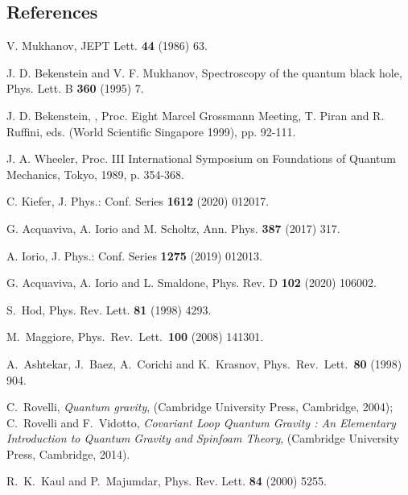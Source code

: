 \documentclass[aps,prd,showkeys,nofootinbib,superscriptaddress]{revtex4-2}
\begin{document}
\begin{thebibliography}{99}

 \section*{References}

V. Mukhanov,
JEPT Lett. {\bf44} (1986) 63.

J. D. Bekenstein and V. F. Mukhanov, Spectroscopy of the quantum black hole,
Phys. Lett. B {\bf 360} (1995) 7.

J. D. Bekenstein, ,
Proc. Eight Marcel Grossmann Meeting, T. Piran and R. Ruffini, eds. (World Scientific Singapore 1999), pp. 92-111.


 J. A. Wheeler,
 Proc. III International Symposium on Foundations of Quantum Mechanics, Tokyo, 1989, p. 354-368.

 C. Kiefer,
J. Phys.: Conf. Series {\bf 1612} (2020) 012017.


 G. Acquaviva, A. Iorio and M. Scholtz,
Ann. Phys. {\bf 387} (2017) 317.

 A. Iorio,
J. Phys.: Conf. Series {\bf 1275} (2019) 012013.

G. Acquaviva, A. Iorio and L. Smaldone,
Phys. Rev. D {\bf 102} (2020) 106002.

S.~Hod,
Phys. Rev. Lett. \textbf{81} (1998) 4293.

M.~Maggiore,
Phys.\ Rev.\ Lett.\ {\bf 100} (2008) 141301.

  A.~Ashtekar, J.~Baez, A.~Corichi and K.~Krasnov,
  Phys.\ Rev.\ Lett.\  {\bf 80} (1998) 904.
	
  C.~Rovelli,
  {\it Quantum gravity}, (Cambridge University Press, Cambridge, 2004);
	 C.~Rovelli and F.~Vidotto,
  {\it Covariant Loop Quantum Gravity : An Elementary Introduction to Quantum Gravity and Spinfoam Theory}, (Cambridge University Press, Cambridge, 2014).

R.~K.~Kaul and P.~Majumdar,
Phys. Rev. Lett. \textbf{84}  (2000) 5255.


\end{thebibliography}
\end{document}
